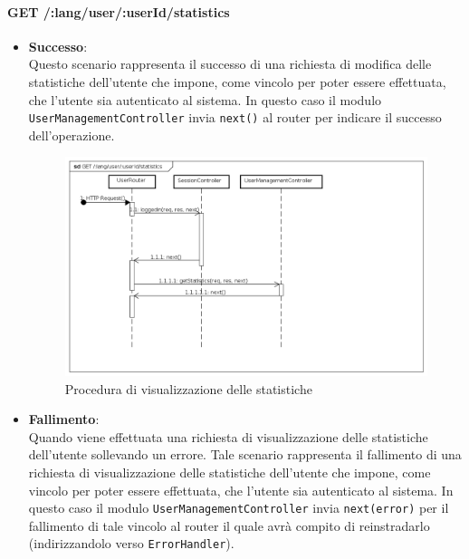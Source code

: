 \paragraph{GET /:lang/user/:userId/statistics}
\begin{itemize}
\item \textbf{Successo}:
\\
Questo scenario rappresenta il successo di una richiesta di modifica delle statistiche  dell'utente che impone, come vincolo per poter essere effettuata, che l'utente sia autenticato al sistema.  
In questo caso il modulo \texttt{UserManagementController} invia \texttt{next()} al router per indicare il successo dell'operazione.

\label{Procedura di visualizzazione delle statistiche}
\begin{figure}[ht]
	\centering
	\includegraphics[scale=0.40]{UML/DiagrammiDiSequenza/Back-end/GET_LangUserUserIdStatisticsSuccess.png}
	\caption{Procedura di visualizzazione delle statistiche}
\end{figure}
\FloatBarrier
\item \textbf{Fallimento}:
\\
Quando viene effettuata una richiesta di visualizzazione delle statistiche dell'utente sollevando un errore. Tale scenario rappresenta il fallimento di una richiesta di visualizzazione delle statistiche dell'utente che impone, come vincolo per poter essere effettuata, che l'utente sia autenticato al sistema. In questo caso il modulo \texttt{UserManagementController} invia \texttt{next(error)} per il fallimento di tale vincolo al router il quale avrà compito di reinstradarlo (indirizzandolo verso \texttt{ErrorHandler}).


\end{itemize}
